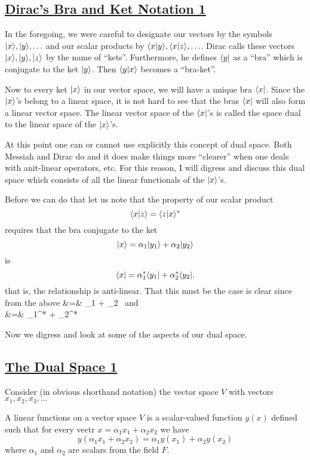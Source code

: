 \subsection{\underline{Dirac's Bra and Ket Notation 1}}
In the foregoing, we were careful to designate our vectors by the symbols $|x\rangle, |y\rangle,\hdots$ and our scalar products by $\langle x| y\rangle, \langle x|z\rangle, \hdots$. Dirac calls these vectors $|x\rangle, |y\rangle, |z\rangle$ by the name
of ``kets''. Furthermore, he defines $\langle y|$ as a ``bra'' which is conjugate to the ket $|y\rangle$. Then $\langle y|x\rangle$ becomes a ``bra-ket''. 

Now to every ket $|x\rangle$ in our vector space, we will have a unique bra $\langle x|$. Since the $|x\rangle$'s belong to a linear space, it is not hard to see that the bras $\langle x|$ will also form a linear vector space. 
The linear vector space of the $\langle x|$'s is called the space dual to the linear space of the $|x\rangle$'s. 

At this point one can or cannot use explicitly this concept of dual space. Both Messiah and Dirac 
do and it does make things more ``clearer'' when one deals with anit-linear operators, etc. For this reason, I will digress and discuss this dual space which consists of all the linear functionals of the $|x\rangle$'s.

Before we can do that let us note that the property of our scalar product $$\langle x|z\rangle = \langle z|x\rangle^*$$ requires that the bra conjugate to the ket $$|x\rangle = \alpha_1|y_1\rangle + \alpha_2|y_2\rangle$$ is
$$\langle x| = \alpha_1^*\langle y_1| + \alpha_2^*\langle y_2|.$$ that is, the relationship is anti-linear. That this must be the case is clear since from the above
\bearray {} &=& \alpha_1 + \alpha_2 \mbox{ and}\\ 
 &=& \alpha_1^* + \alpha_2^*
\eearray

Now we digress and look at some of the aspects of our dual space. 

\subsection{\underline{The Dual Space 1}}
Consider (in obvious shorthand notation) the vector space $V$ with vectors $x_1, x_2, x_3,\hdots$

\begin{definition}
A linear functions on a vector space $V$ is a scalar-valued function $y(x)$ defined such that for every vectr $x=\alpha_1 x_1 + \alpha_2 x_2$ we have
$$y(\alpha_1 x_1 + \alpha_2 x_2) = \alpha_1 y(x_1) + \alpha_2 y(x_2)$$ where $\alpha_1$ and $\alpha_2$ are scalars from the field $F$. 
\end{definition}

